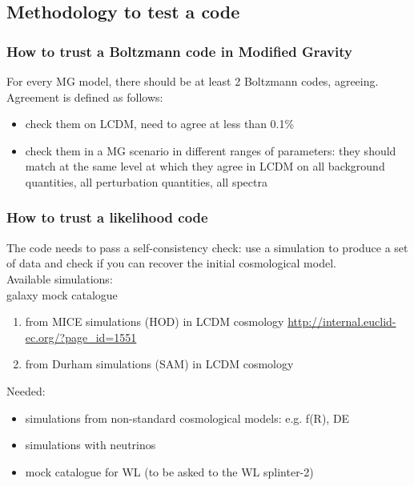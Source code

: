 \subsection{Methodology to test a code}

\subsubsection{How to trust a Boltzmann code in Modified Gravity}

For every MG model, there should be at least 2 Boltzmann codes, agreeing. Agreement is defined as follows: 
\begin{itemize}
 \item check them on LCDM, need to agree at less than 0.1\%
 \item check them in a MG scenario in different ranges of parameters: they should match at the same level at which they agree in LCDM on 
all background quantities, all perturbation quantities, all spectra
\end{itemize}

\subsubsection{How to trust a likelihood code}
The code needs to pass a self-consistency check: use a simulation to produce a set of data and check if you can recover the initial cosmological model.\\
Available simulations: \\
galaxy mock catalogue
\begin{enumerate}
 \item from MICE simulations (HOD) in LCDM cosmology  \url{http://internal.euclid-ec.org/?page_id=1551}
 \item from Durham simulations (SAM) in LCDM cosmology 
\end{enumerate}
Needed:
\begin{itemize}
 \item simulations from non-standard cosmological models: e.g. f(R), DE 
 \item simulations with neutrinos
 \item mock catalogue for WL (to be asked to the WL splinter-2)
\end{itemize}


